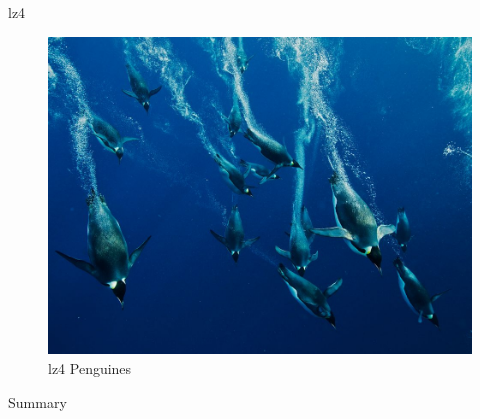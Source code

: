 \documentclass[10pt, compress]{beamer}
\begin{document}
\begin{frame}{lz4}
\begin{figure}[h]
	\centering
	\includegraphics[scale=0.2, angle=-5]{pics/lz4pinguin.jpg}
	\caption{lz4 Penguines}
\end{figure}
\end{frame}

\begin{frame}{Summary}
\end{frame}
\end{document}
